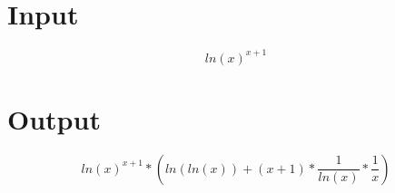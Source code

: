\documentclass[a4paper, 12pt]{article}
\begin{document}
\Large
\section{Input}

\[ln(x ) ^ {x + 1 }\]
\section{Output}

\[ln(x ) ^ {x + 1 }* (ln(ln(x ) ) + (x + 1 )* \frac{1 }{ln(x ) }* \frac{1 }{x })\]
\end{document}
